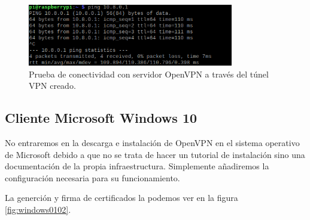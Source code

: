 \documentclass[a4paper, 11pt, titlepage]{article}
\begin{document}
        \begin{figure}[htp]
            \centering
            \includegraphics[width=0.8\textwidth]{resources/raspy09.png}
            \caption{Prueba de conectividad con servidor OpenVPN a través del túnel VPN creado.}
            \label{fig:raspy09}
        \end{figure}  

    \subsection{Cliente Microsoft Windows 10}

        No entraremos en la descarga e instalación de OpenVPN en el sistema operativo de
        Microsoft debido a que no se trata de hacer un tutorial de instalación sino una 
        documentación de la propia infraestructura. Simplemente añadiremos la configuración
        necesaria para su funcionamiento.

        La generción y firma de certificados la podemos ver en la figura \ref{fig:windows0102}.
\end{document}
